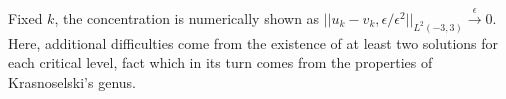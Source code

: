 \documentclass[a5paper,doc,10pt,noapacite]{apa6}
\def\pnorm||#1||_#2,#3{||#1||_{L^{#2}(#3)}}
\newcommand{\bull}{\textbullet \ }
\newcommand{\tendsto}[1][ ]{\stackrel{ #1 }{\longrightarrow}}
\newcommand{\AbstractCA}[7]{%
	\addcontentsline{toc}{subsection}{#1 \footnotesize(\emph{#2})}
	\begin{center}
		\bf\scshape#1
	\end{center}
	\vspace{-0.85\baselineskip}
	\begin{center}
		{\scriptsize%
			  #2					%
			  #3		\bull			%
		\textsf{#4}		\bull			%
		\texttt{#5}		\\[-1em]		%
		\emph{#6} }				%
	\end{center}
	\vspace{-0.5\baselineskip}
	\begin{spacing}{1.2}
		\footnotesize
		\hspace{15.0pt}
		#7	
	\end{spacing}
	\vspace{1\baselineskip}
}
\begin{document}
{{Fixed $k$, the concentration is numerically shown as $\pnorm||u_k - v_{k,\epsilon}/ \epsilon^{2} ||_2,{-3,3}\tendsto[\epsilon] 0$.
Here, additional difficulties come from the existence of at least two solutions for each critical level, fact which in its turn comes from the properties of Krasnoselski's genus.}

\vfill
\newpage






}
\end{document}
